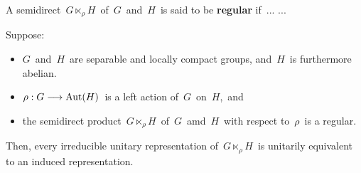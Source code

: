 

\vskip 0.5cm
\begin{definition}
\mbox{}
\vskip 0.1cm
\noindent
A semidirect
\,$G \ltimes_{\rho}\! H$\, of \,$G$\, and \,$H$\,
is said to be \textbf{regular} if \,... ...
\end{definition}


\vskip 0.5cm
\begin{theorem}
\mbox{}
\vskip 0.1cm
\noindent
Suppose:
\begin{itemize}
\item
	$G$\, and \,$H$\, are separable and locally compact groups, and
	\,$H$\, is furthermore abelian.
\item
	$\rho : G \longrightarrow \textnormal{Aut}(H)$\,
	is a left action of \,$G$\, on \,$H$,\, and
\item
	the semidirect product
	\,$G \ltimes_{\rho}\! H$\, of \,$G$\, amd \,$H$\,
	with respect to \,$\rho$\,
	is a regular.
\end{itemize}
Then, every irreducible unitary representation of
\,$G \ltimes_{\rho}\! H$\,
is unitarily equivalent to an induced representation.
\end{theorem}

